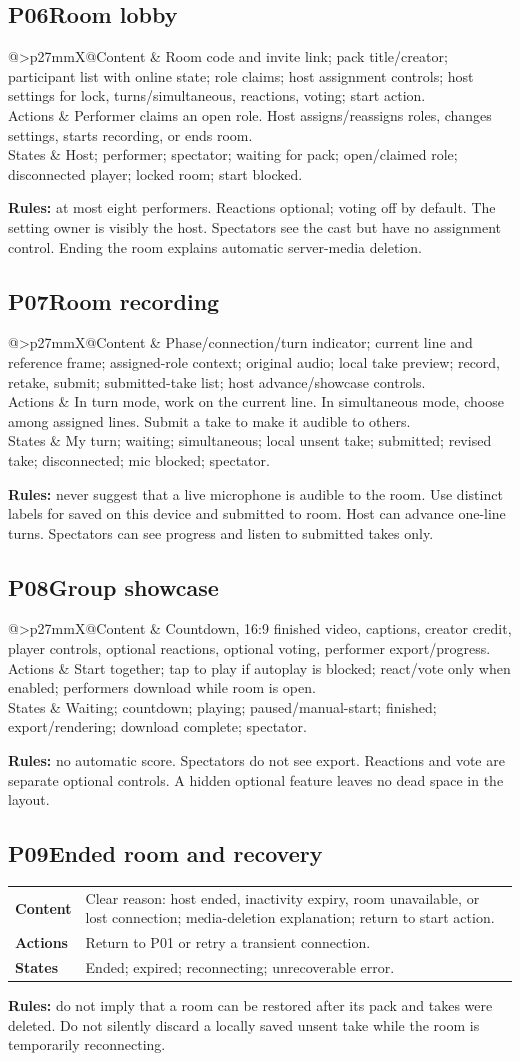 \documentclass[10pt,a4paper]{article}
\makeatletter
\newcommand{\screen}[2]{\Needspace{60pt}\subsection*{\color{ink}#1\quad #2}}
\newcommand{\contract}[3]{\begin{tabularx}{\linewidth}{@{}>{\bfseries\color{teal}}p{27mm}X@{}}Content & #1\\[3pt]Actions & #2\\[3pt]States & #3\end{tabularx}}
\makeatother
\begin{document}
\screen{P06}{Room lobby}
\contract{Room code and invite link; pack title/creator; participant list with online state; role claims; host assignment controls; host settings for lock, turns/simultaneous, reactions, voting; start action.}{Performer claims an open role. Host assigns/reassigns roles, changes settings, starts recording, or ends room.}{Host; performer; spectator; waiting for pack; open/claimed role; disconnected player; locked room; start blocked.}
\textbf{Rules:} at most eight performers. Reactions optional; voting off by default. The setting owner is visibly the host. Spectators see the cast but have no assignment control. Ending the room explains automatic server-media deletion.

\screen{P07}{Room recording}
\contract{Phase/connection/turn indicator; current line and reference frame; assigned-role context; original audio; local take preview; record, retake, submit; submitted-take list; host advance/showcase controls.}{In turn mode, work on the current line. In simultaneous mode, choose among assigned lines. Submit a take to make it audible to others.}{My turn; waiting; simultaneous; local unsent take; submitted; revised take; disconnected; mic blocked; spectator.}
\textbf{Rules:} never suggest that a live microphone is audible to the room. Use distinct labels for saved on this device and submitted to room. Host can advance one-line turns. Spectators can see progress and listen to submitted takes only.

\screen{P08}{Group showcase}
\contract{Countdown, 16:9 finished video, captions, creator credit, player controls, optional reactions, optional voting, performer export/progress.}{Start together; tap to play if autoplay is blocked; react/vote only when enabled; performers download while room is open.}{Waiting; countdown; playing; paused/manual-start; finished; export/rendering; download complete; spectator.}
\textbf{Rules:} no automatic score. Spectators do not see export. Reactions and vote are separate optional controls. A hidden optional feature leaves no dead space in the layout.

\screen{P09}{Ended room and recovery}
\contract{Clear reason: host ended, inactivity expiry, room unavailable, or lost connection; media-deletion explanation; return to start action.}{Return to P01 or retry a transient connection.}{Ended; expired; reconnecting; unrecoverable error.}
\textbf{Rules:} do not imply that a room can be restored after its pack and takes were deleted. Do not silently discard a locally saved unsent take while the room is temporarily reconnecting.
\end{document}
